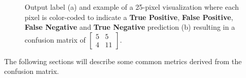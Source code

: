 \begin{figure}[H]%
    \centering
    \caption[Output label and color-coded true/false positive/negative prediction]{Output label (a) and example of a 25-pixel visualization where each pixel is color-coded to indicate a \textbf{\textcolor{rwucyan}{True Positive}}, \textbf{\textcolor{rwucyanlight}{False Positive}}, \textbf{\textcolor{rwuviolet}{False Negative}} and \textbf{\textcolor{rwuvioletlight}{True Negative}} prediction (b) resulting in a confusion matrix of $\begin{bmatrix}5&5\\4&11\end{bmatrix}$.}
    \label{confusion_matrix_example}
\end{figure}
The following sections will describe some common metrics derived from the confusion matrix.

